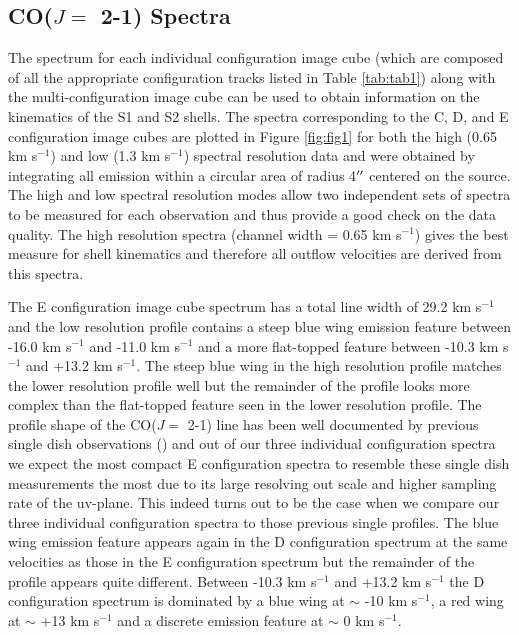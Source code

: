 \documentclass[preprint2]{aastex}
\begin{document}
\subsection{CO($J=$ 2-1) Spectra} \label{results1} %

The spectrum for each individual configuration image cube (which are composed of all the appropriate configuration tracks listed in Table \ref{tab:tab1}) along with the multi-configuration image cube can be used to obtain information on the kinematics of the S1 and S2 shells. The spectra corresponding  to the C, D, and E configuration image cubes are plotted in Figure \ref{fig:fig1} for both the high (0.65 km s${}^{-1}$) and low (1.3 km s${}^{-1}$) spectral resolution data and were obtained by integrating all emission within a circular area of radius 4$\mbox{$^{\prime\prime}$}$ centered on the source. The high and low spectral resolution modes allow two independent sets of spectra to be measured for each observation and thus provide a good check on the data quality. The high resolution  spectra (channel width = 0.65 km s${}^{-1}$)  gives the best measure for shell kinematics and therefore all outflow velocities are derived from this spectra.

The E configuration image cube spectrum has a total line width of 29.2 km s${}^{-1}$ and the low resolution profile contains a steep blue wing emission feature between -16.0 km s${}^{-1}$ and -11.0 km s${}^{-1}$ and a more flat-topped feature between -10.3 km s${}^{-1}$ and +13.2 km s${}^{-1}$. The steep blue wing in the high resolution profile matches the lower resolution profile well but the  remainder of the profile looks more complex than the flat-topped feature seen in the lower resolution profile. The profile shape of the CO($J=$ 2-1) line has been well documented by previous single dish observations () and out of our three individual configuration spectra we expect the most compact E configuration spectra to resemble these single dish measurements the most due to its large resolving out scale and higher sampling rate of the uv-plane. This indeed turns out to be the case when we compare our three individual configuration spectra to those previous single profiles. The blue wing emission feature appears again in the D configuration spectrum at the same velocities as those in the E configuration spectrum but the remainder of the profile appears quite different. Between -10.3 km s${}^{-1}$ and +13.2 km s${}^{-1}$ the D configuration spectrum is dominated by a blue wing at $\sim$ -10 km s${}^{-1}$, a red wing at $\sim$ +13 km s${}^{-1}$ and a discrete emission feature at $\sim$ 0 km s${}^{-1}$. 
\end{document}
